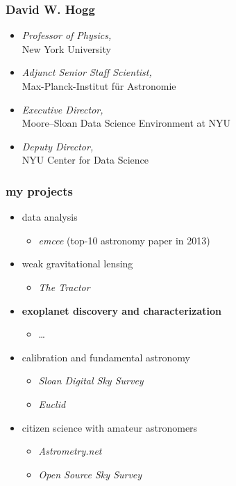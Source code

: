 \documentclass{beamer}
\renewcommand{\emph}[1]{\textbf{#1}}
\newcommand{\project}[1]{\textsl{#1}}
\begin{document}
\begin{frame}
  \frametitle{David W. Hogg}
  \begin{itemize}
  \item \textsl{Professor of Physics,}\\ New York University
  \item \textsl{Adjunct Senior Staff Scientist,}\\ Max-Planck-Institut f\"ur Astronomie
  \item \textsl{Executive Director,}\\ Moore--Sloan Data Science Environment at NYU
  \item \textsl{Deputy Director,}\\ NYU Center for Data Science
  \end{itemize}
\end{frame}

\begin{frame}
  \frametitle{my projects}
  \begin{itemize}
  \item data analysis
    \begin{itemize}
    \item \project{emcee} (top-10 astronomy paper in 2013)
    \end{itemize}
  \item weak gravitational lensing
    \begin{itemize}
    \item \project{The Tractor}
    \end{itemize}
  \item \emph{exoplanet discovery and characterization}
    \begin{itemize}
    \item \ldots
    \end{itemize}
  \item calibration and fundamental astronomy
    \begin{itemize}
    \item \project{Sloan Digital Sky Survey}
    \item \project{Euclid}
    \end{itemize}
  \item citizen science with amateur astronomers
    \begin{itemize}
    \item \project{Astrometry.net}
    \item \project{Open Source Sky Survey}
    \end{itemize}
  \end{itemize}
\end{frame}
\end{document}
